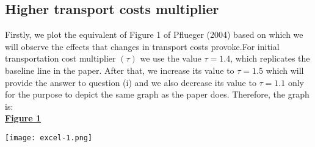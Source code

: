 \documentclass[11pt]{article}
\begin{document}
\subsection{Higher transport costs multiplier}
Firstly, we plot the equivalent of Figure 1 of Pflueger (2004) based on which we will observe the effects that changes in transport costs provoke.For initial transportation cost multiplier $(\tau)$ we use the value  $\tau=1.4$, which replicates the baseline line in the paper. After that, we increase its value to $\tau=1.5$ which will provide the answer to question (i) and we also decrease its value to $\tau=1.1$ only for the purpose to depict the same graph as the paper does. Therefore, the graph is: \\

\underline{\Large{\textbf{Figure 1}}}
\begin{center}
\texttt{[image: excel-1.png]}
\end{center}
\end{document}
